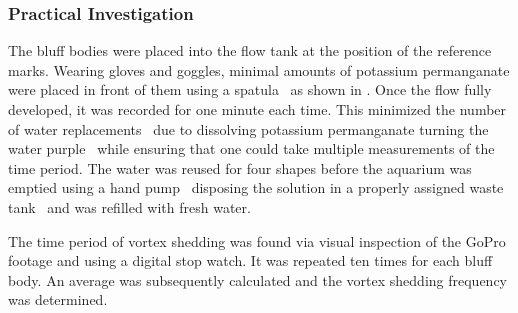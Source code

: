 \subsubsection{Practical Investigation}
The bluff bodies were placed into the flow tank at the position of the reference marks. Wearing gloves and goggles, minimal amounts of potassium permanganate were placed in front of them using a spatula \textemdash\ as shown in . Once the flow fully developed, it was recorded for one minute each time. This minimized the number of water replacements \textemdash\ due to dissolving potassium permanganate turning the water purple \textemdash\ while ensuring that one could take multiple measurements of the time period. The water was reused for four shapes before the aquarium was emptied using a hand pump \textemdash\ disposing the solution in a properly assigned waste tank \textemdash\ and was refilled with fresh water. 

The time period of vortex shedding was found via visual inspection of the GoPro footage and using a digital stop watch. It was repeated ten times for each bluff body. An average was subsequently calculated and the vortex shedding frequency was determined.
